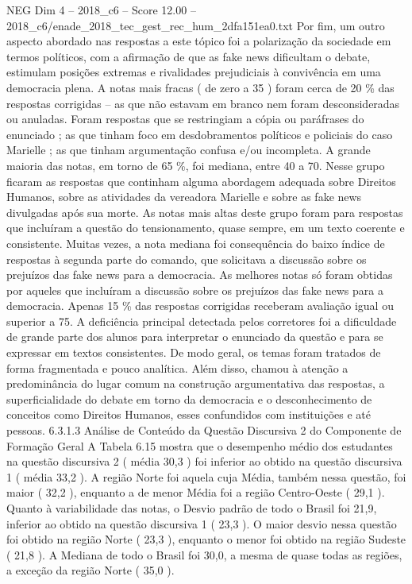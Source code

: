 \begin{textsample}{NEG Dim 4 – 2018\_c6 – Score 12.00 – 2018\_c6/enade\_2018\_tec\_gest\_rec\_hum\_2dfa151ea0.txt}
Por fim, um outro aspecto abordado nas respostas a este tópico foi a polarização da sociedade em termos políticos, com a afirmação de que as fake news dificultam o debate, estimulam posições extremas e rivalidades prejudiciais à convivência em uma democracia plena.
A notas mais fracas ( de zero a 35 ) foram cerca de 20 \% das respostas corrigidas – as que não estavam em branco nem foram desconsideradas ou anuladas.
Foram respostas que se restringiam a cópia ou paráfrases do enunciado ; as que tinham foco em desdobramentos políticos e policiais do caso Marielle ; as que tinham argumentação confusa e/ou incompleta.
A grande maioria das notas, em torno de 65 \%, foi mediana, entre 40 a 70.
Nesse grupo ficaram as respostas que continham alguma abordagem adequada sobre Direitos Humanos, sobre as atividades da vereadora Marielle e sobre as fake news divulgadas após sua morte.
As notas mais altas deste grupo foram para respostas que incluíram a questão do tensionamento, quase sempre, em um texto coerente e consistente.
Muitas vezes, a nota mediana foi consequência do baixo índice de respostas à segunda parte do comando, que solicitava a discussão sobre os prejuízos das fake news para a democracia.
As melhores notas só foram obtidas por aqueles que incluíram a discussão sobre os prejuízos das fake news para a democracia.
Apenas 15 \% das respostas corrigidas receberam avaliação igual ou superior a 75.
A deficiência principal detectada pelos corretores foi a dificuldade de grande parte dos alunos para interpretar o enunciado da questão e para se expressar em textos consistentes.
De modo geral, os temas foram tratados de forma fragmentada e pouco analítica.
Além disso, chamou à atenção a predominância do lugar comum na construção argumentativa das respostas, a superficialidade do debate em torno da democracia e o desconhecimento de conceitos como Direitos Humanos, esses confundidos com instituições e até pessoas. 6.3.1.3 Análise de Conteúdo da Questão Discursiva 2 do Componente de Formação Geral A Tabela 6.15 mostra que o desempenho médio dos estudantes na questão discursiva 2 ( média 30,3 ) foi inferior ao obtido na questão discursiva 1 ( média 33,2 ).
A região Norte foi aquela cuja Média, também nessa questão, foi maior ( 32,2 ), enquanto a de menor Média foi a região Centro-Oeste ( 29,1 ).
Quanto à variabilidade das notas, o Desvio padrão de todo o Brasil foi 21,9, inferior ao obtido na questão discursiva 1 ( 23,3 ).
O maior desvio nessa questão foi obtido na região Norte ( 23,3 ), enquanto o menor foi obtido na região Sudeste ( 21,8 ).
A Mediana de todo o Brasil foi 30,0, a mesma de quase todas as regiões, a exceção da região Norte ( 35,0 ).

\end{textsample}
